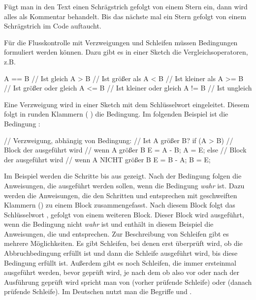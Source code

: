 Fügt man in den Text einen Schrägstrich gefolgt von einem Stern \code{/*} ein, dann wird alles als Kommentar behandelt.
Bis das nächste mal ein Stern gefolgt von einem Schrägstrich \code{*/} im Code auftaucht.

\newpage{}

Für die Flusskontrolle mit Verzweigungen und Schleifen müssen Bedingungen formuliert werden können. Dazu gibt es in einer Sketch die Vergleichsoperatoren, z.B.

\begin{src}
A == B     // Ist gleich
A >  B     // Ist größer als
A <  B     // Ist kleiner als
A >= B     // Ist größer oder gleich
A <= B     // Ist kleiner oder gleich
A != B     // Ist ungleich
\end{src}
\vfill\null\columnbreak
{}
Eine Verzweigung wird in einer Sketch mit dem Schlüsselwort  eingeleitet. 
Diesem folgt in runden Klammern (  ) die Bedingung. 
Im folgenden Beispiel ist die Bedingung :

\begin{src}
// Verzweigung, abhängig von Bedingung: 
// Ist A größer B?
if (A > B)
{
  // Block der ausgeführt wird 
  // wenn A größer B
  E = A - B;  
  A = E;      
}
else
{
  // Block der ausgeführt wird 
  // wenn A NICHT größer B
  E = B - A;  
  B = E;      
}
\end{src}

Im Beispiel werden die Schritte  bis  aus  gezeigt. Nach der Bedingung folgen die Anweisungen, 
die ausgeführt werden sollen, wenn die Bedingung \emph{wahr} ist. 
Dazu werden die Anweisungen, die den Schritten  und  entsprechen mit geschweiften Klammern () zu einem Block zusammengefasst. 
Nach diesem Block folgt das Schlüsselwort , gefolgt von einem weiteren Block. 
Dieser Block wird ausgeführt, wenn die Bedingung nicht \emph{wahr} ist und enthält in diesem Beispiel die Anweisungen, die  und  entsprechen.
\vfill\null\pagebreak
{}
Zur Beschreibung von Schleifen gibt es mehrere Möglichkeiten. Es gibt Schleifen, bei denen erst überprüft wird, ob die Abbruchbedingung erfüllt ist und dann die Schleife ausgeführt wird, bis diese Bedingung erfüllt ist. Außerdem gibt es noch Schleifen, die immer ersteinmal ausgeführt werden, bevor geprüft wird, 
je nach dem ob also vor oder nach der Ausführung geprüft wird spricht man
von  (vorher prüfende Schleife) oder  (danach prüfende Schleife).
Im Deutschen nutzt man die Begriffe  und .

